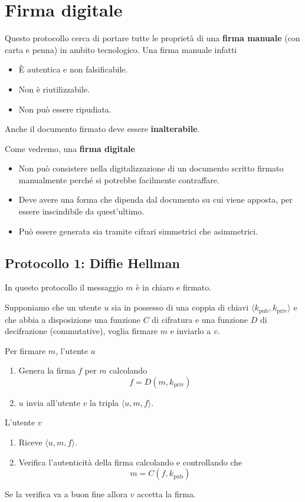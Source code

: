 \section{Firma digitale}
Questo protocollo cerca di portare tutte le propriet\`a di una \textbf{firma manuale} (con carta e penna) in ambito
tecnologico. Una firma manuale infatti
\begin{itemize}
	\item \`E autentica e non falsificabile.
	\item Non \`e riutilizzabile.
	\item Non pu\`o essere ripudiata.
\end{itemize}
Anche il documento firmato deve essere \textbf{inalterabile}.

Come vedremo, una \textbf{firma digitale}
\begin{itemize}
	\item Non pu\`o consistere nella digitalizzazione di un documento scritto firmato manualmente perch\'e si
	      potrebbe facilmente contraffare.
	\item Deve avere una forma che dipenda dal documento su cui viene apposta, per essere inscindibile da
	      quest'ultimo.
	\item Pu\`o essere generata sia tramite cifrari simmetrici che asimmetrici.
\end{itemize}

\subsection{Protocollo 1: Diffie Hellman}
In questo protocollo il messaggio $m$ \`e in chiaro e firmato.

Supponiamo che un utente $u$ sia in possesso di una coppia di chiavi $\langle k_\text{pub}, k_\text{priv} \rangle$ e
che abbia a disposizione una funzione $C$ di cifratura e una funzione $D$ di decifrazione (commutative), voglia
firmare $m$ e inviarlo a $v$.

Per firmare $m$, l'utente $u$
\begin{enumerate}
	\item Genera la firma $f$ per $m$ calcolando
	      \[ f = D(m, k_\text{priv}) \]
	\item $u$ invia all'utente $v$ la tripla $\langle u, m, f \rangle$.
\end{enumerate}
L'utente $v$
\begin{enumerate}
	\item Riceve $\langle u, m, f \rangle$.
	\item Verifica l'autenticit\`a della firma calcolando e controllando che
	      \[ m = C(f, k_\text{pub}) \]
\end{enumerate}
Se la verifica va a buon fine allora $v$ accetta la firma.

